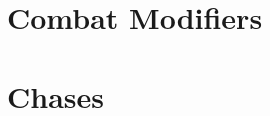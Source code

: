 \newpage
\chapter{Combat Modifiers} \label{ch:cb_combat_modifiers}


\newpage
\chapter{Chases} \label{ch:cb_chases}

%
%

%


